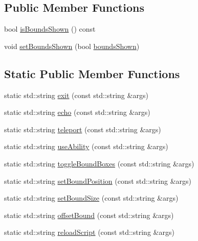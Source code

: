 \subsection*{Public Member Functions}
\begin{DoxyCompactItemize}
\item 
bool \hyperlink{classZeta_1_1ConsoleFunctions_a0fc245176635bc9839df05180dc54e85}{is\+Bounds\+Shown} () const 
\item 
void \hyperlink{classZeta_1_1ConsoleFunctions_a69b48bf060d9c96d2e1cc52606c21906}{set\+Bounds\+Shown} (bool \hyperlink{classZeta_1_1ConsoleFunctions_ab493f2acca519714be35b1f821d21422}{bounds\+Shown})
\end{DoxyCompactItemize}
\subsection*{Static Public Member Functions}
\begin{DoxyCompactItemize}
\item 
static std\+::string \hyperlink{classZeta_1_1ConsoleFunctions_abab9d670fa482c97d4b22a7c2ed033d0}{exit} (const std\+::string \&args)
\item 
static std\+::string \hyperlink{classZeta_1_1ConsoleFunctions_a2182303550ce1bd56f471e9a3e3d1e9c}{echo} (const std\+::string \&args)
\item 
static std\+::string \hyperlink{classZeta_1_1ConsoleFunctions_a8f524cd2bd76c5ba85f16528cc7cc1d0}{teleport} (const std\+::string \&args)
\item 
static std\+::string \hyperlink{classZeta_1_1ConsoleFunctions_ab1a1977bfb56fa3ba44c99b1d03ca1df}{use\+Ability} (const std\+::string \&args)
\item 
static std\+::string \hyperlink{classZeta_1_1ConsoleFunctions_a7f90a5a1df8c4ade37f382a4e1e85df0}{toggle\+Bound\+Boxes} (const std\+::string \&args)
\item 
static std\+::string \hyperlink{classZeta_1_1ConsoleFunctions_a47a0c6f038fd9bd9bb572f0ebdfa3cf0}{set\+Bound\+Position} (const std\+::string \&args)
\item 
static std\+::string \hyperlink{classZeta_1_1ConsoleFunctions_aecaa5ce0a4b57f801eb06bc4f14c46c3}{set\+Bound\+Size} (const std\+::string \&args)
\item 
static std\+::string \hyperlink{classZeta_1_1ConsoleFunctions_a7850bf2985e29ac68ce2c03cbaf8ceb4}{offset\+Bound} (const std\+::string \&args)
\item 
static std\+::string \hyperlink{classZeta_1_1ConsoleFunctions_ac2ce2a78fcd52cf2c91c9ee267d7dd4e}{reload\+Script} (const std\+::string \&args)
\end{DoxyCompactItemize}
